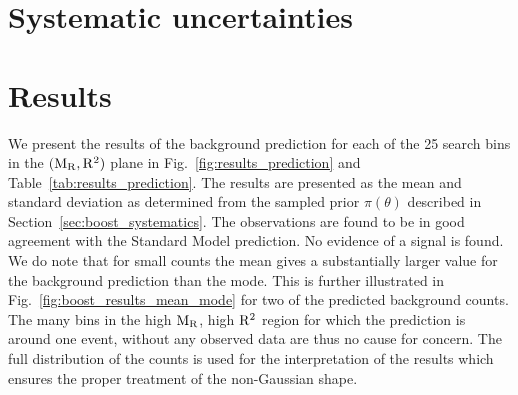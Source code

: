 



\section{Systematic uncertainties \label{sec:boost_systematics}}





\section{Results \label{sec:boost_results}}

We present the results of the background prediction for each of the 25 search bins in the
$(\mathrm{M_R},\mathrm{R^2})$ plane in Fig.~\ref{fig:results_prediction} and Table~\ref{tab:results_prediction}. The
results are presented as the mean and standard deviation as determined from the sampled prior
$\pi(\theta)$ described in Section~\ref{sec:boost_systematics}.  
The observations are found to be in good agreement with the Standard Model prediction. 
No evidence of a signal is found.
We do note that for small counts the mean gives a substantially larger value for the background
prediction than the mode. This is further illustrated in Fig.~\ref{fig:boost_results_mean_mode} for
two of the predicted background counts. 
The many bins in the high $\mathrm{M_R}$, high $\mathrm{R^2}$ region for which the prediction is around one event,
without any observed data are thus no cause for concern.
The full distribution of the counts is used for the interpretation of the results which
ensures the proper treatment of the non-Gaussian shape.

